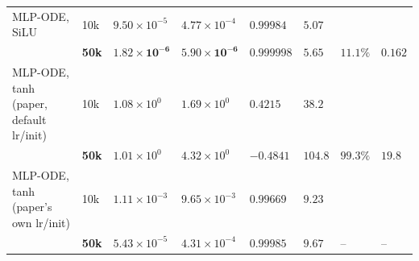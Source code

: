 \begin{table}[!ht]
\begin{tabular}{@{}L{2.6cm} C{0.9cm} C{1.7cm} C{1.7cm} C{1.35cm} C{0.8cm} C{1.0cm} C{1.3cm}@{}}
MLP-ODE, SiLU & 10k & $9.50\times10^{-5}$ & $4.77\times10^{-4}$ & $0.99984$ & $5.07$ & & \\
 & \textbf{50k} & $\mathbf{1.82\times10^{-6}}$ & $\mathbf{5.90\times10^{-6}}$ & $\mathbf{0.999998}$ & $5.65$ & $11.1\%$ & $0.162$\\
\addlinespace
MLP-ODE, tanh (paper, default lr/init) & 10k & $1.08\times10^{0}$ & $1.69\times10^{0}$ & $0.4215$ & $38.2$ & & \\
 & \textbf{50k} & $1.01\times10^{0}$ & $4.32\times10^{0}$ & $-0.4841$ & $104.8$ & $99.3\%$ & $19.8$\\
\addlinespace
MLP-ODE, tanh (paper's own lr/init) & 10k & $1.11\times10^{-3}$ & $9.65\times10^{-3}$ & $0.99669$ & $9.23$ & & \\
 & \textbf{50k} & $5.43\times10^{-5}$ & $4.31\times10^{-4}$ & $0.99985$ & $9.67$ & -- & -- \\
\bottomrule
\end{tabular}
\end{table}

